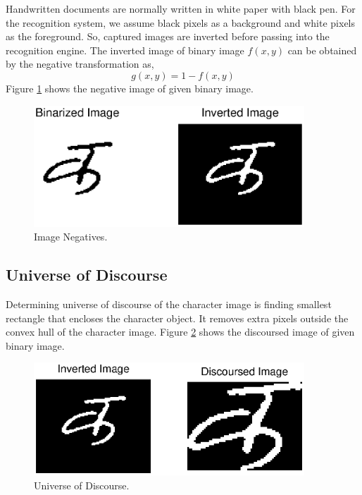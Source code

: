 Handwritten documents are normally written in white paper with black pen. For the recognition system, we assume black pixels as a background and white pixels as the foreground. So, captured images are inverted before passing into the recognition engine. The inverted image of binary image $f(x,y)$ can be obtained by the negative transformation as,
\begin{equation}
g(x,y)=1-f(x,y)
\end{equation}
Figure \ref{figure_inverted} shows the negative image of given binary image.
\begin{figure}[h]
\centering
\includegraphics[width=4in]{figures/ka_preprocessing/inverted.eps}
\caption{Image Negatives.}
\label{figure_inverted}
\end{figure}

\subsection{Universe of Discourse}\label{section_discourse}
Determining universe of discourse of the character image is finding smallest rectangle that encloses the character object. It removes extra pixels outside the convex hull of the character image. Figure \ref{figure_discoursed} shows the discoursed image of given binary image.
\begin{figure}[h]
\centering
\includegraphics[width=4in]{figures/ka_preprocessing/discoursed.eps}
\caption{Universe of Discourse.}
\label{figure_discoursed}
\end{figure}

